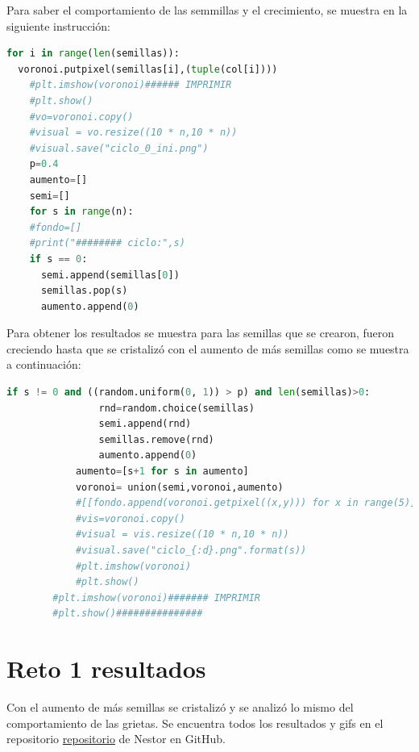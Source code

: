 \documentclass{article}
\begin{document}
Para saber el comportamiento de las semmillas y el crecimiento, se muestra en la siguiente instrucción: 

\begin{lstlisting}[caption=Comportamiento y Crecimiento de las semillas, language=Python]
for i in range(len(semillas)):
  voronoi.putpixel(semillas[i],(tuple(col[i])))
    #plt.imshow(voronoi)###### IMPRIMIR
    #plt.show()
    #vo=voronoi.copy()
    #visual = vo.resize((10 * n,10 * n))
    #visual.save("ciclo_0_ini.png")
    p=0.4
    aumento=[]
    semi=[]
    for s in range(n):
    #fondo=[]
    #print("######## ciclo:",s)
    if s == 0:
      semi.append(semillas[0])
      semillas.pop(s)
      aumento.append(0)
\end{lstlisting}

Para obtener los resultados se muestra para las semillas que se crearon, fueron creciendo hasta que se cristalizó con el aumento de más semillas como se muestra a continuación:

\begin{lstlisting}[caption=Obtención del resultado comportamiento del crecimiento de las semillas, language=Python]
if s != 0 and ((random.uniform(0, 1)) > p) and len(semillas)>0:
                rnd=random.choice(semillas)
                semi.append(rnd)
                semillas.remove(rnd)
                aumento.append(0)
            aumento=[s+1 for s in aumento]
            voronoi= union(semi,voronoi,aumento)
            #[[fondo.append(voronoi.getpixel((x,y))) for x in range(5)]for y in range(5)]
            #vis=voronoi.copy()
            #visual = vis.resize((10 * n,10 * n))
            #visual.save("ciclo_{:d}.png".format(s))
            #plt.imshow(voronoi)
            #plt.show()
        #plt.imshow(voronoi)####### IMPRIMIR
        #plt.show()###############
\end{lstlisting}


\section{Reto 1 resultados}\label{con}
Con el aumento de más semillas se cristalizó y se analizó lo mismo del comportamiento de las grietas. Se encuentra todos los resultados y gifs en el repositorio \href{https://github.com/NestorZeus/SIMULACION-COMPUTACIONAL-DE-NANOMATERIALES/tree/main/P4}{repositorio} de Nestor en GitHub.\\
\end{document}
